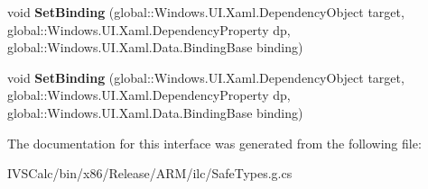 \begin{DoxyCompactItemize}
void {\bfseries Set\+Binding} (global\+::\+Windows.\+U\+I.\+Xaml.\+Dependency\+Object target, global\+::\+Windows.\+U\+I.\+Xaml.\+Dependency\+Property dp, global\+::\+Windows.\+U\+I.\+Xaml.\+Data.\+Binding\+Base binding)
\item 
\mbox{\label{interface_windows_1_1_u_i_1_1_xaml_1_1_data_1_1_i_binding_operations_statics_a525ee1b6596932ce7df82780a243635b}} 
void {\bfseries Set\+Binding} (global\+::\+Windows.\+U\+I.\+Xaml.\+Dependency\+Object target, global\+::\+Windows.\+U\+I.\+Xaml.\+Dependency\+Property dp, global\+::\+Windows.\+U\+I.\+Xaml.\+Data.\+Binding\+Base binding)
\end{DoxyCompactItemize}


The documentation for this interface was generated from the following file\+:\begin{DoxyCompactItemize}
\item 
I\+V\+S\+Calc/bin/x86/\+Release/\+A\+R\+M/ilc/Safe\+Types.\+g.\+cs\end{DoxyCompactItemize}
